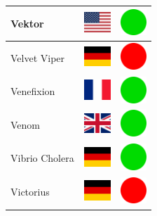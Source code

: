 \documentclass[12pt, a4paper, twoside]{report}
\begin{document}
\begin{center}
\begin{longtable}{|p{5cm}|p{2cm}|p{2cm}|}
Vektor & \includegraphics[width=1cm]{4x3/us} & \includegraphics[width=1cm]{likes/y} \\ \hline
Velvet Viper & \includegraphics[width=1cm]{4x3/de} & \includegraphics[width=1cm]{likes/n} \\ \hline
Venefixion & \includegraphics[width=1cm]{4x3/fr} & \includegraphics[width=1cm]{likes/y} \\ \hline
Venom & \includegraphics[width=1cm]{4x3/gb} & \includegraphics[width=1cm]{likes/y} \\ \hline
Vibrio Cholera & \includegraphics[width=1cm]{4x3/de} & \includegraphics[width=1cm]{likes/y} \\ \hline
Victorius & \includegraphics[width=1cm]{4x3/de} & \includegraphics[width=1cm]{likes/n} \\ \hline

\end{longtable}
\end{center}
\end{document}
